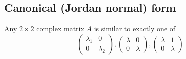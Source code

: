 \documentclass[a4paper]{article}
\begin{document}
  \subsection{Canonical (Jordan normal) form}
  \begin{thm}
    Any $2\times 2$ complex matrix $A$ is similar to exactly one of
    \[
      \begin{pmatrix}
        \lambda_1 & 0\\
        0 & \lambda_2
      \end{pmatrix},
      \begin{pmatrix}
        \lambda & 0\\
        0 & \lambda
      \end{pmatrix},
      \begin{pmatrix}
        \lambda & 1\\
        0 & \lambda
      \end{pmatrix}
    \]
  \end{thm}
\end{document}
